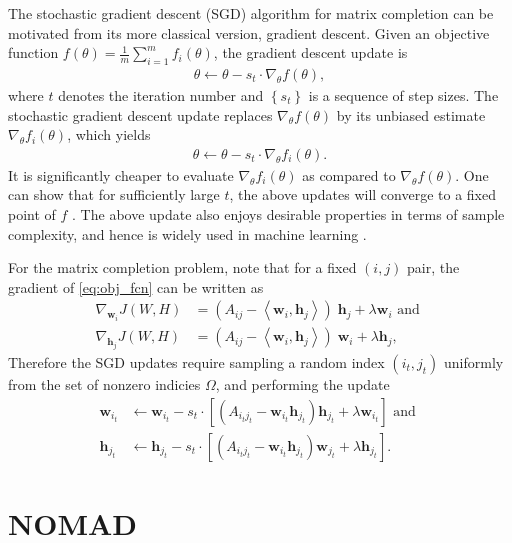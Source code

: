 \documentclass{vldb}
\newcommand{\hb}{\mathbf{h}}
\newcommand{\wb}{\mathbf{w}}
\newcommand{\rbr}[1]{\left(#1\right)}
\newcommand{\sbr}[1]{\left[#1\right]}
\newcommand{\cbr}[1]{\left\{#1\right\}}
\newcommand{\inner}[2]{\left\langle #1,#2 \right\rangle}
\begin{document}
The stochastic gradient descent (SGD) algorithm for matrix completion
can be motivated from its more classical version, gradient
descent. Given an objective function $f(\theta) = \frac{1}{m}
\sum_{i=1}^{m} f_{i}(\theta)$, the gradient descent update is
\begin{align}
  \label{eq:grd_desc}
  \theta \leftarrow \theta - s_{t} \cdot \nabla_{\theta} f(\theta),
\end{align}
where $t$ denotes the iteration number and $\cbr{s_{t}}$ is a sequence
of step sizes. The stochastic gradient descent update replaces
$\nabla_{\theta} f(\theta)$ by its unbiased estimate $\nabla_{\theta}
f_{i}(\theta)$, which yields
\begin{align}
  \label{eq:stoch_grd_desc}
  \theta \leftarrow \theta - s_{t} \cdot \nabla_{\theta} f_{i}(\theta). 
\end{align}
It is significantly cheaper to evaluate $\nabla_{\theta} f_{i}(\theta)$
as compared to $\nabla_{\theta} f(\theta)$. One can show that for
sufficiently large $t$, the above updates will converge to a fixed point
of $f$ \citep{KusCla78,RobMon51}. The above update also enjoys desirable
properties in terms of sample complexity, and hence is widely used in
machine learning \citep{BotBou11,ShaSre08}. 

For the matrix completion problem, note that for a fixed $(i,j)$ pair,
the gradient of \eqref{eq:obj_fcn} can be written as 
\begin{align*}
  \nabla_{\wb_{i}} J(W, H) & = (A_{ij} - \inner{\wb_{i}}{\hb_{j}}) \;
  \hb_{j} + \lambda \wb_{i}
  \text { and } \\
  \nabla_{\hb_{j}} J(W, H) & = (A_{ij} - \inner{\wb_{i}}{\hb_{j}}) \;
  \wb_{i} + \lambda \hb_{j},
\end{align*}
Therefore the SGD updates require sampling a random index $\rbr{i_{t},
  j_{t}}$ uniformly from the set of nonzero indicies $\Omega$, and
performing the update
\begin{align}
  \label{eq:w_update}
  \wb_{i_t} &\leftarrow
  \wb_{i_t} - 
  s_t \cdot
  \sbr{(A_{{i_t}{j_t}} - \wb_{i_t} \hb_{j_t}) \hb_{j_t}
    + \lambda \wb_{i_t}} \text { and }
  \\
  \label{eq:h_update}
  \hb_{j_t} &\leftarrow
  \hb_{j_t} - 
  s_t \cdot
  \sbr{(A_{{i_t}{j_t}} - \wb_{i_t} \hb_{j_t}) \wb_{j_t}
    + \lambda \hb_{j_t}}.
\end{align}

\section{NOMAD}
\label{sec:NOMAD}
\end{document}
